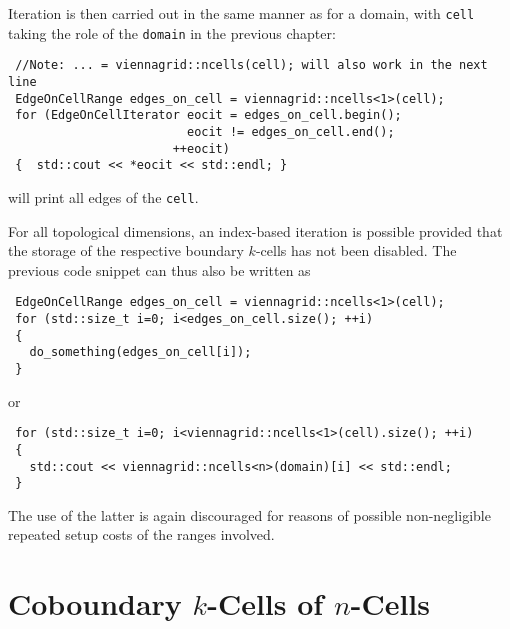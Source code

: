 Iteration is then carried out in the same manner as for a domain, with \lstinline|cell| taking the role of the \lstinline|domain| in the previous chapter:
\begin{lstlisting}
 //Note: ... = viennagrid::ncells(cell); will also work in the next line
 EdgeOnCellRange edges_on_cell = viennagrid::ncells<1>(cell);
 for (EdgeOnCellIterator eocit = edges_on_cell.begin();
                         eocit != edges_on_cell.end();
                       ++eocit)
 {  std::cout << *eocit << std::endl; } 
\end{lstlisting}
will print all edges of the \lstinline|cell|.

For all topological dimensions, an index-based iteration is possible provided that the storage of the respective boundary $k$-cells has not been disabled. The previous code snippet can thus also be written as
\begin{lstlisting}
 EdgeOnCellRange edges_on_cell = viennagrid::ncells<1>(cell);
 for (std::size_t i=0; i<edges_on_cell.size(); ++i)
 { 
   do_something(edges_on_cell[i]);
 }
\end{lstlisting}
or
\begin{lstlisting}
 for (std::size_t i=0; i<viennagrid::ncells<1>(cell).size(); ++i)
 {
   std::cout << viennagrid::ncells<n>(domain)[i] << std::endl;
 }
\end{lstlisting}
The use of the latter is again discouraged for reasons of possible non-negligible repeated setup costs of the ranges involved.



\section{Coboundary $k$-Cells of $n$-Cells}





